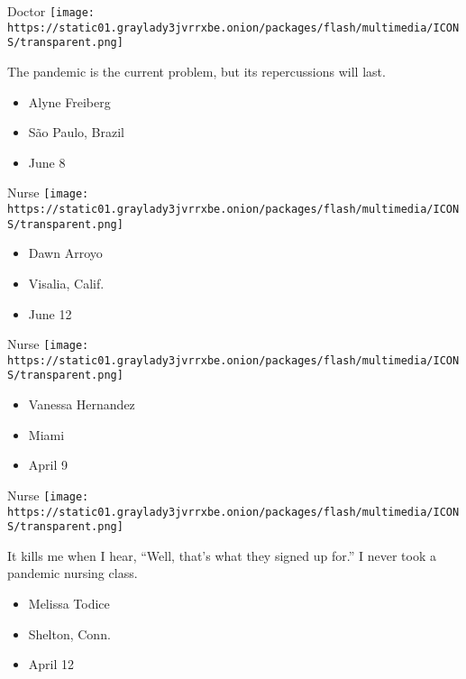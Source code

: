 \protect\hyperlink{item-alyne-freiberg}{}

Doctor
\texttt{[image: https://static01.graylady3jvrrxbe.onion/packages/flash/multimedia/ICONS/transparent.png]}

The pandemic is the current problem, but its repercussions will last.

\begin{itemize}
\tightlist
\item
  Alyne Freiberg
\item
  São Paulo, Brazil
\item
  June 8
\end{itemize}

\protect\hyperlink{item-dawn-arroyo}{}

Nurse
\texttt{[image: https://static01.graylady3jvrrxbe.onion/packages/flash/multimedia/ICONS/transparent.png]}

\begin{itemize}
\tightlist
\item
  Dawn Arroyo
\item
  Visalia, Calif.
\item
  June 12
\end{itemize}

\protect\hyperlink{item-vanessa-hernandez}{}

Nurse
\texttt{[image: https://static01.graylady3jvrrxbe.onion/packages/flash/multimedia/ICONS/transparent.png]}

\begin{itemize}
\tightlist
\item
  Vanessa Hernandez
\item
  Miami
\item
  April 9
\end{itemize}

\protect\hyperlink{item-melissa-todice}{}

Nurse
\texttt{[image: https://static01.graylady3jvrrxbe.onion/packages/flash/multimedia/ICONS/transparent.png]}

It kills me when I hear, ``Well, that's what they signed up for.'' I
never took a pandemic nursing class.

\begin{itemize}
\tightlist
\item
  Melissa Todice
\item
  Shelton, Conn.
\item
  April 12
\end{itemize}

\protect\hyperlink{item-nuria-poveda}{}

